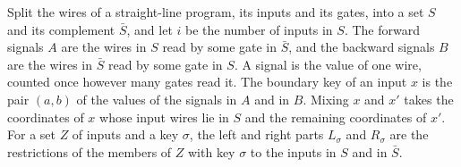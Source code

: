 \begin{definition}
  \label{def:lowerbounds-algebraic-single-cut}
  \leanok
  Split the wires of a straight-line program, its inputs and its gates, into
  a set $S$ and its complement $\bar S$, and let $i$ be the number of inputs
  in $S$. The forward signals $A$ are the wires in $S$ read by some gate in
  $\bar S$, and the backward signals $B$ are the wires in $\bar S$ read by
  some gate in $S$. A signal is the value of one wire, counted once however
  many gates read it. The boundary key of an input $x$ is the pair $(a, b)$
  of the values of the signals in $A$ and in $B$. Mixing $x$ and $x'$ takes
  the coordinates of $x$ whose input wires lie in $S$ and the remaining
  coordinates of $x'$. For a set $Z$ of inputs and a key $\sigma$, the left
  and right parts $L_\sigma$ and $R_\sigma$ are the restrictions of the
  members of $Z$ with key $\sigma$ to the inputs in $S$ and in $\bar S$.
\end{definition}

